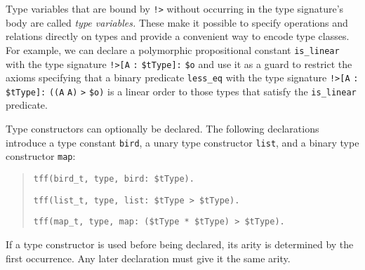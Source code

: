 Type variables that are bound by {\tt !>} without
occurring in the type signature's body are called \emph{\theghost{} type variables.}
These make it possible to specify operations and relations directly on types and
provide a convenient way to encode type classes.
For example, we can declare a polymorphic propositional
constant {\tt is\_linear} with the type signature
{\tt !>[A} {\tt :} {\tt \$tType]:} {\tt \$o} and use it as a guard to restrict the
axioms specifying that a binary predicate {\tt less\_eq} with the type signature
{\tt !>[A} {\tt :} {\tt \$tType]:} {\tt ((A} {\tt *} {\tt A)} {\tt >} {\tt \$o)}
is a linear order to those types that satisfy the {\tt is\_linear} predicate.


 Type constructors
can optionally be declared.
The following declarations introduce a type
constant {\tt bird}, a unary type constructor {\tt list},
and a binary type constructor {\tt map}:
\begin{quote}
\verb+tff(bird_t, type, bird: $tType).+
\par\smallskip
\verb+tff(list_t, type, list: $tType > $tType).+
\par\smallskip
\verb+tff(map_t, type, map: ($tType * $tType) > $tType).+
\end{quote}
If a type constructor is used before being declared, its arity is
determined by the first occurrence. Any later declaration
must give it the same arity.

